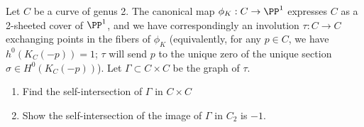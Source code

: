 \begin{exercise}\label{blow-up of $J(C)$ at a point}
Let $C$ be a curve of genus 2. The canonical map $\phi_K : C \to \PP^1$ expresses $C$ as a 2-sheeted cover of $\PP^1$, and we have correspondingly an involution $\tau : C \to C$ exchanging points in the fibers of $\phi_K$ (equivalently, for any $p \in C$, we have $h^0(K_C(-p)) = 1$; $\tau$ will send $p$ to the unique zero of the unique section $\sigma \in H^0(K_C(-p))$). Let $\Gamma \subset C \times C$ be the graph of $\tau$.
\begin{enumerate}
\item Find the self-intersection of $\Gamma$ in $C \times C$
\item Show the self-intersection of the image of $\Gamma$ in $C_2$ is $-1$.
\end{enumerate}
\end{exercise}



